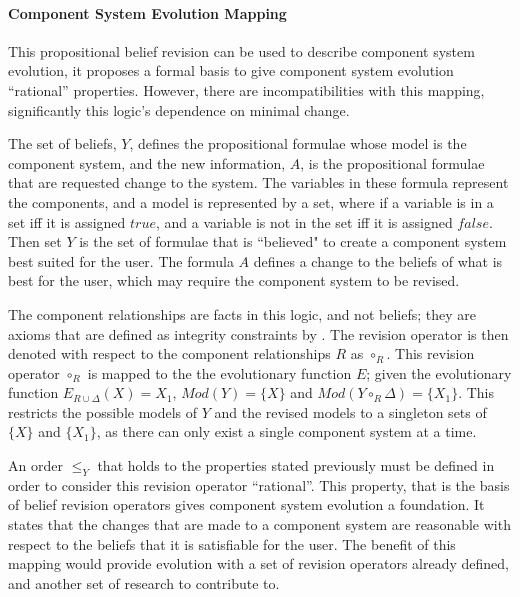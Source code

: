 \paragraph{Component System Evolution Mapping}
This propositional belief revision can be used to describe component system evolution, it proposes a formal basis to give component system evolution ``rational'' properties.
However, there are incompatibilities with this mapping, significantly this logic's dependence on minimal change.

The set of beliefs, $Y$, defines the propositional formulae whose model is the component system,
and the new information, $A$, is the propositional formulae that are requested change to the system.
The variables in these formula represent the components, and a model is represented by a set, where if a variable is in a set iff it is assigned $true$, 
and a variable is not in the set iff it is assigned $false$. 
Then set $Y$ is the set of formulae that is ``believed" to create a component system best suited for the user.
The formula $A$ defines a change to the beliefs of what is best for the user, which may require the component system to be revised.

The component relationships are facts in this logic, and not beliefs; they are axioms that are defined as integrity constraints by \cite{katsuno1991propositional}.
The revision operator is then denoted with respect to the component relationships $R$ as $\circ_R$.
This revision operator $\circ_R$ is mapped to the the evolutionary function $E$;
given the evolutionary function $E_{R \cup \Delta}(X) = X_1$, $Mod(Y) = \{X\}$ and $Mod(Y \circ_R \Delta) = \{X_1\}$.
This restricts the possible models of $Y$ and the revised models to a singleton sets of $\{X\}$ and $\{X_1\}$,
as there can only exist a single component system at a time.

An order $\leq_{Y}$ that holds to the properties stated previously must be defined in order to consider this revision operator ``rational''.
This property, that is the basis of belief revision operators gives component system evolution a foundation.
It states that the changes that are made to a component system are reasonable with respect to the beliefs that it is satisfiable for the user.
The benefit of this mapping would provide evolution with a set of revision operators already defined, and another set of research to contribute to.

